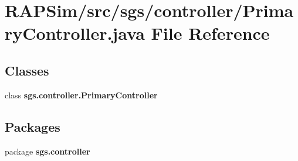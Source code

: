 \section{R\-A\-P\-Sim/src/sgs/controller/\-Primary\-Controller.java File Reference}
\label{_primary_controller_8java}
\subsection*{Classes}
\begin{DoxyCompactItemize}
\item 
class {\bf sgs.\-controller.\-Primary\-Controller}
\end{DoxyCompactItemize}
\subsection*{Packages}
\begin{DoxyCompactItemize}
\item 
package {\bf sgs.\-controller}
\end{DoxyCompactItemize}
